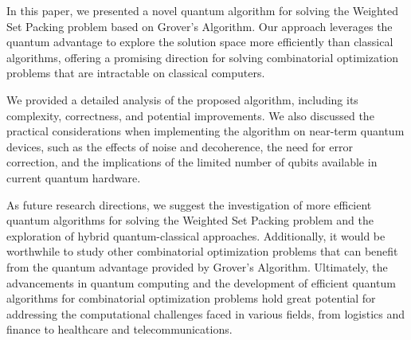 In this paper, we presented a novel quantum algorithm for solving the Weighted Set Packing problem based on Grover's Algorithm. Our approach leverages the quantum advantage to explore the solution space more efficiently than classical algorithms, offering a promising direction for solving combinatorial optimization problems that are intractable on classical computers.

We provided a detailed analysis of the proposed algorithm, including its complexity, correctness, and potential improvements. We also discussed the practical considerations when implementing the algorithm on near-term quantum devices, such as the effects of noise and decoherence, the need for error correction, and the implications of the limited number of qubits available in current quantum hardware.

As future research directions, we suggest the investigation of more efficient quantum algorithms for solving the Weighted Set Packing problem and the exploration of hybrid quantum-classical approaches. Additionally, it would be worthwhile to study other combinatorial optimization problems that can benefit from the quantum advantage provided by Grover's Algorithm. Ultimately, the advancements in quantum computing and the development of efficient quantum algorithms for combinatorial optimization problems hold great potential for addressing the computational challenges faced in various fields, from logistics and finance to healthcare and telecommunications.



